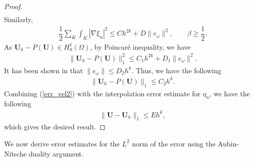 \documentclass[11pt]{article}
\begin{document}
\begin{proof}
\begin{equation}
\begin{aligned}
\end{aligned}
\end{equation}
Similarly, 
\begin{equation*}
\begin{aligned}
&\dfrac{1}{2} \sum_{K}\int_K |\nabla \xi_u|^2
\leq
Ch^{2k} + D \|e_\omega\|^2, \qquad \beta \geq \dfrac{1}{2}.
\end{aligned}
\end{equation*}
As $\textbf{U}_h- P(\textbf{U})\in H^1_0(\Omega)$, by Poincar\'e inequality, we have
\begin{equation}\label{err_vel_1}
\begin{aligned}
&\|\textbf{U}_h-P(\textbf{U})\|_1^2
\leq
C_1 h^{2k} + D_1 \|e_\omega\|^2.
\end{aligned}
\end{equation}
It has been shown in \cite{Liu_Shu} that $\|e_\omega\| \leq D_2 h^k$. Thus, we have the following
\begin{equation}\label{err_vel2}
\begin{aligned}
&\|\textbf{U}_h-P(\textbf{U})\|_1 \leq C_2 h^{k}.
\end{aligned}
\end{equation}
Combining (\ref{err_vel2}) with the interpolation error estimate for $\eta_u$, we have the following
\begin{equation}\label{err_vel}
\begin{aligned}
&\|\textbf{U}-\textbf{U}_h\|_1 \leq E h^{k},
\end{aligned}
\end{equation} 
which gives the desired result.
\end{proof}

We now derive error estimates for the $L^2$ norm of the error using the Aubin-Nitsche duality argument.
\end{document}
